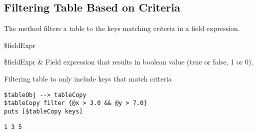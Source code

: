 \documentclass{article}
\begin{document}
\subsection{Filtering Table Based on Criteria}
The method  filters a table to the keys matching criteria in a field expression. 
\begin{syntax}
 \$fieldExpr
\end{syntax}
\begin{args}
\$fieldExpr & Field expression that results in boolean value (true or false, 1 or 0).
\end{args}
\begin{example}{Filtering table to only include keys that match criteria}
\begin{lstlisting}
$tableObj --> tableCopy
$tableCopy filter {@x > 3.0 && @y > 7.0}
puts [$tableCopy keys]
\end{lstlisting}
\tcblower
\begin{lstlisting}
1 3 5
\end{lstlisting}
\end{example}

\clearpage
\end{document}
